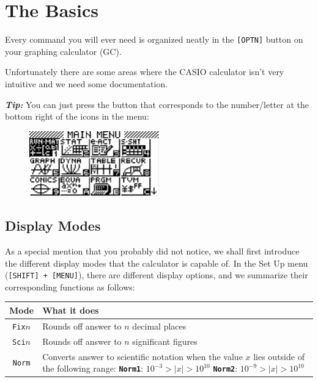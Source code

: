 \documentclass[a5paper]{memoir}
\def\code#1{\texttt{#1}}
\def\tip#1{\textcolor[HTML]{a9109f}{\textbf{\textit{Tip:}}} #1}
\begin{document}
\mainmatter
\chapter{The Basics}
Every command you will ever need is organized neatly in the \code{[OPTN]} button on your graphing calculator (GC).

Unfortunately there are some areas where the CASIO calculator isn't very intuitive and we need some documentation.

\tip{You can just press the button that corresponds to the number/letter at the bottom right of the icons in the menu:}

\begin{figure}[h]
	\centering
	\includegraphics[width=0.5\textwidth]{mainmenu}
\end{figure}

\section{Display Modes}
As a special mention that you probably did not notice, we shall first introduce the different display modes that the calculator is capable of. In the Set Up menu (\code{[SHIFT] + [MENU]}), there are different display options, and we summarize their corresponding functions as follows:
\begin{center}
	\renewcommand{\arraystretch}{1.3}
	\begin{tabular}{|c|p{7.5cm}|}
		\hline
		\textbf{Mode}	&	\textbf{What it does} \\
		\hline
		\code{Fix}$n$	&	Rounds off answer to $n$ decimal places \\
		\hline
		\code{Sci}$n$	&	Rounds off answer to $n$ significant figures \\
		\hline
		\code{Norm}		&	Converts answer to scientific notation when the value $x$ lies outside of the following range: \vspace{2mm} \newline \hspace*{5mm} \textbf{\code{Norm1}}: $10^{-3}>|x|>10^{10}$ \newline \hspace*{5mm} \textbf{\code{Norm2}}: $10^{-9}>|x|>10^{10}$ \\
		\hline
	\end{tabular}
\end{center}
\end{document}
